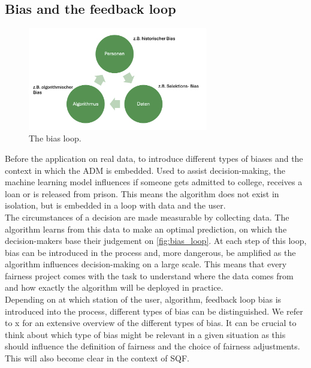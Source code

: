 \subsection{Bias and the feedback loop}
\begin{figure}
    \centering
    \includegraphics[width=0.7\textwidth]{../figures/bias_loop.png}
    \caption{The bias loop.}
    \label{fig:bias_loop}
\end{figure}

Before the application on real data, to introduce different types of biases and the context in which the ADM is embedded.
Used to assist decision-making, the machine learning model influences if someone gets admitted to college, receives a loan or is released from prison. This means the algorithm does not exist in isolation, but is embedded in a loop with data and the user.\\
The circumstances of a decision are made measurable by collecting data. The algorithm learns from this data to make an optimal prediction, on which the decision-makers base their judgement on \autoref{fig:bias_loop}. At each step of this loop, bias can be introduced in the process and, more dangerous, be amplified as the algorithm influences decision-making on a large scale.
This means that every fairness project comes with the task to understand where the data comes from and how exactly the algorithm will be deployed in practice.\\
Depending on at which station of the user, algorithm, feedback loop bias is introduced into the process, different types of bias can be distinguished. We refer to x for an extensive overview of the different types of bias. It can be crucial to think about which type of bias might be relevant in a given situation as this should influence the definition of fairness and the choice of fairness adjustments. This will also become clear in the context of SQF.\\

